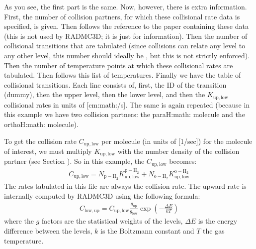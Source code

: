 \documentclass[letterpaper,10pt,english]{sphinxmanual}
\begin{document}
As you see, the first part is the same. Now, however, there is extra
information.  First, the number of collision partners, for which these
collisional rate data is specified, is given. Then follows the reference to the
paper containing these data (this is not used by RADMC\sphinxhyphen{}3D; it is just for
information). Then the number of collisional transitions that are tabulated
(since collisions can relate any level to any other level, this number should
ideally be , but this is not strictly enforced). Then
the number of temperature points at which these collisional rates are
tabulated. Then follows this list of temperatures.  Finally we have the table of
collisional transitions. Each line consists of, first, the ID of the transition
(dummy), then the upper level, then the lower level, and then the
\(K_{\mathrm{up,low}}\) collisional rates in units of {[}cm:math:/s{]}. The
same is again repeated (because in this example we have two collision partners:
the para\sphinxhyphen{}H:math: molecule and the ortho\sphinxhyphen{}H:math: molecule).

To get the collision rate \(C_{\mathrm{up,low}}\) per molecule (in units of
{[}1/sec{]}) for the molecule of interest, we must multiply
\(K_{\mathrm{up,low}}\) with the number density of the collision partner
(see Section {\hyperref[\detokenize{lineradtrans:sec-collpartner}]{}}).  So in this example, the
\(C_{\mathrm{up,low}}\) becomes:
\begin{equation*}
\begin{split}C_{\mathrm{up,low}} = N_{\mathrm{p-H}_2}K^{\mathrm{p-H}_2}_{\mathrm{up,low}}
+ N_{\mathrm{o-H}_2}K^{\mathrm{o-H}_2}_{\mathrm{up,low}}\end{split}
\end{equation*}
The rates tabulated in this file are always the  collision rate. The
upward rate is internally computed by RADMC\sphinxhyphen{}3D using the following formula:
\begin{equation*}
\begin{split}C_{\mathrm{low,up}} = C_{\mathrm{up,low}} \frac{g_{\mathrm{up}}}{g_{\mathrm{low}}}
\exp\left(-\frac{\Delta E}{kT}\right)\end{split}
\end{equation*}
where the \(g\) factors are the statistical weights of the levels,
\(\Delta E\) is the energy difference between the levels, \(k\) is the
Boltzmann constant and \(T\) the gas temperature.
\end{document}
